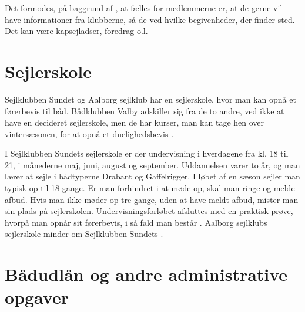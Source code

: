 Det formodes, på baggrund af , at fælles for medlemmerne er, at de gerne vil have informationer fra klubberne, så de ved hvilke begivenheder, der finder sted. 
Det kan være kapsejladser, foredrag o.l.


\section{Sejlerskole}\label{sec:sejlerskole}

Sejlklubben Sundet og Aalborg sejlklub har en sejlerskole, hvor man kan opnå et førerbevis til båd. 
Bådklubben Valby adskiller sig fra de to andre, ved ikke at have en decideret sejlerskole, men de har kurser, man kan tage hen over vintersæsonen, for at opnå et duelighedsbevis \citep{baedklubben_valby_duelighedsbevis}.

I Sejlklubben Sundets sejlerskole er der undervisning i hverdagene fra kl. 18 til 21, i månederne maj, juni, august og september. 
Uddannelsen varer to år, og man lærer at sejle i bådtyperne Drabant og Gaffelrigger. 
I løbet af en sæson sejler man typisk op til 18 gange. 
Er man forhindret i at møde op, skal man ringe og melde afbud.
Hvis man ikke møder op tre gange, uden at have meldt afbud, mister man sin plads på sejlerskolen.
Undervisningsforløbet afsluttes med en praktisk prøve, hvorpå man opnår sit førerbevis, i så
fald man består \citep{Sundet}. 
Aalborg sejlklubs sejlerskole minder om Sejlklubben Sundets \citep{aalborg_sejlklub_sejlerskole}.


\section{Bådudlån og andre administrative opgaver}\label{subsec:bådudlån}


